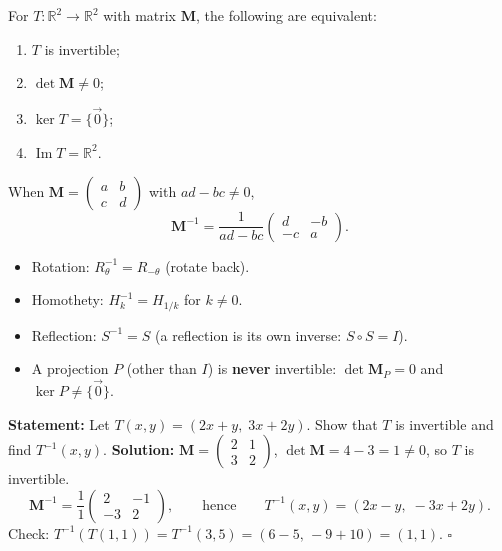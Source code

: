 \documentclass[11pt]{article}
\begin{document}
\begin{propriete}
For $T : \mathbb{R}^2 \to \mathbb{R}^2$ with matrix $\mathbf{M}$, the following are equivalent:
\begin{enumerate}
    \item $T$ is invertible;
    \item $\det \mathbf{M} \neq 0$;
    \item $\ker T = \{\vec{0}\}$;
    \item $\operatorname{Im} T = \mathbb{R}^2$.
\end{enumerate}
When $\mathbf{M} = \begin{pmatrix} a & b \\ c & d \end{pmatrix}$ with $ad-bc\neq 0$,
\[
\mathbf{M}^{-1} = \frac{1}{ad-bc}\begin{pmatrix} d & -b \\ -c & a \end{pmatrix}.
\]
\end{propriete}

\begin{exemplebox}
\begin{itemize}
    \item Rotation: $R_\theta^{-1} = R_{-\theta}$ (rotate back).
    \item Homothety: $H_k^{-1} = H_{1/k}$ for $k\neq 0$.
    \item Reflection: $S^{-1} = S$ (a reflection is its own inverse: $S\circ S = I$).
    \item A projection $P$ (other than $I$) is \textbf{never} invertible: $\det \mathbf{M}_P = 0$ and $\ker P \neq \{\vec{0}\}$.
\end{itemize}
\end{exemplebox}

\begin{exoresolu}
\noindent\textbf{Statement:} Let $T(x,y) = (2x+y,\; 3x+2y)$. Show that $T$ is invertible and find $T^{-1}(x,y)$.
\tcblower
\noindent\textbf{Solution:}
$\mathbf{M} = \begin{pmatrix}2&1\\3&2\end{pmatrix}$, $\det\mathbf{M} = 4-3 = 1 \neq 0$, so $T$ is invertible.
\[
\mathbf{M}^{-1} = \frac{1}{1}\begin{pmatrix}2&-1\\-3&2\end{pmatrix},
\qquad\text{hence}\qquad
T^{-1}(x,y) = (2x - y,\; -3x + 2y).
\]
Check: $T^{-1}(T(1,1)) = T^{-1}(3,5) = (6-5,\, -9+10) = (1,1)$. \hfill$\square$
\end{exoresolu}
\end{document}
